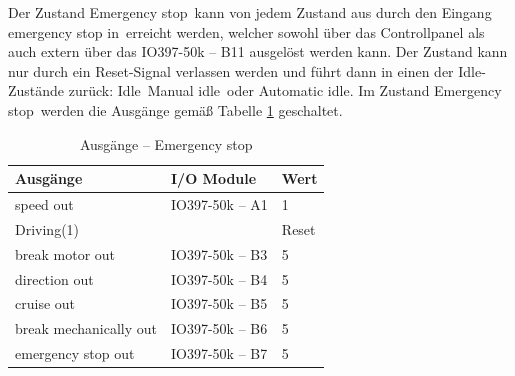 Der Zustand \frqq Emergency stop\flqq\ kann von jedem Zustand aus durch den Eingang \frqq emergency stop in\flqq\ erreicht werden, welcher sowohl über das Controllpanel als auch extern über das IO397-50k – B11 ausgelöst werden kann. Der Zustand kann nur durch ein Reset-Signal verlassen werden und führt dann in einen der Idle-Zustände zurück: \frqq Idle\flqq\ \frqq Manual idle\flqq\ oder \frqq Automatic idle\flqq. Im Zustand \frqq Emergency stop\flqq\ werden die Ausgänge gemäß Tabelle \ref{Automat_man:tab:z_Emergency_stop} geschaltet.


\pagebreak[1]
\begin{table}[!ht]
	\centering
	\caption{Ausgänge – Emergency stop}
	\label{Automat_man:tab:z_Emergency_stop}
	\begin{tabular}{lll}
		\hline
		\textbf{Ausgänge}                           & \textbf{I/O Module}                 & \textbf{Wert} \\ \hline
		\multicolumn{1}{l|}{speed out}              & \multicolumn{1}{l|}{IO397-50k – A1} & 1             \\
		\multicolumn{1}{l|}{Driving(1)}             & \multicolumn{1}{l|}{}               & Reset         \\
		\multicolumn{1}{l|}{break motor out}        & \multicolumn{1}{l|}{IO397-50k – B3} & 5             \\
		\multicolumn{1}{l|}{direction out}          & \multicolumn{1}{l|}{IO397-50k – B4} & 5             \\
		\multicolumn{1}{l|}{cruise out}             & \multicolumn{1}{l|}{IO397-50k – B5} & 5             \\
		\multicolumn{1}{l|}{break mechanically out} & \multicolumn{1}{l|}{IO397-50k – B6} & 5             \\
		\multicolumn{1}{l|}{emergency stop out}     & \multicolumn{1}{l|}{IO397-50k – B7} & 5             \\ \hline
	\end{tabular}
\end{table}
\pagebreak[4]









